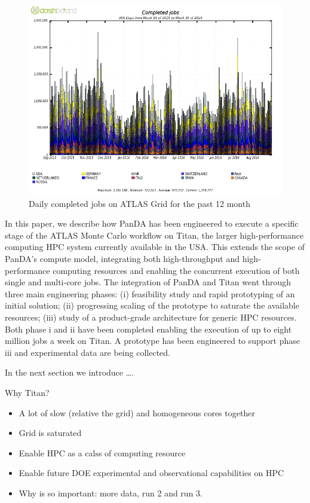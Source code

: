 \begin{figure}
    \begin{center}
        \includegraphics[width=\columnwidth]{figures/DailyJobs.png}
        \caption{Daily completed jobs on ATLAS Grid for the past 12 month}
    \end{center}
\label{fig:daily}
\end{figure}

In this paper, we describe how PanDA has been engineered to execute a specific
stage of the ATLAS Monte Carlo workflow on Titan, the larger high-performance
computing HPC system currently available in the USA\@. This extends
the scope of PanDA's compute model, integrating both high-throughput and
high-performance computing resources and enabling the concurrent execution of
both  single and multi-core jobs. The integration of PanDA and Titan went
through three main engineering phases: (i) feasibility study and rapid
prototyping of an initial solution; (ii) progressing scaling of the  prototype
to saturate the available resources; (iii) study of a product-grade architecture
for generic HPC resources. Both phase i and ii have been completed enabling the
execution of up to eight million jobs a week on Titan. A prototype has been
engineered to support phase iii and experimental data are being collected.

In the next section we introduce \ldots.

Why Titan?
\begin{itemize}
    \item A lot of slow (relative the grid) and homogeneous cores together
    \item Grid is saturated
    \item Enable HPC as a calss of computing resource
    \item Enable future DOE experimental and observational capabilities on HPC
    \item Why is so important: more data, run 2 and run 3.
\end{itemize}
